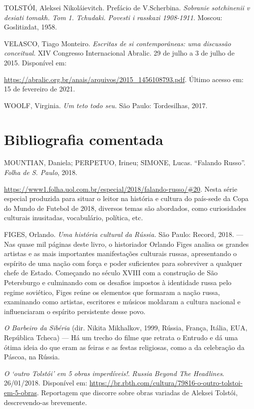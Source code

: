 \documentclass{article}
\begin{document}
TOLSTÓI, Aleksei Nikoláievitch. Prefácio de V.Scherbina. \emph{Sobranie
sotchinenii v desiati tomakh. Tom 1. Tchudaki. Povesti i rasskazi
1908-1911}. Moscou: Goslitizdat, 1958.

VELASCO, Tiago Monteiro. \emph{Escritas de si contemporâneas: uma
discussão conceitual.} XIV Congresso Internacional Abralic. 29 de julho
a 3 de julho de 2015. Disponível em:

\url{https://abralic.org.br/anais/arquivos/2015\_1456108793.pdf}.
Último acesso em: 15 de fevereiro de 2021.

WOOLF, Virginia. \emph{Um teto todo seu.} São Paulo: Tordesilhas, 2017.

\section{Bibliografia comentada}

MOUNTIAN, Daniela; PERPETUO, Irineu; SIMONE, Lucas. ``Falando Russo''.
\emph{Folha de S. Paulo}, 2018.

\url{https://www1.folha.uol.com.br/especial/2018/falando-russo/\#20}.
Nesta série especial produzida para situar o leitor na história e
cultura do país-sede da Copa do Mundo de Futebol de 2018, diversos temas
são abordados, como curiosidades culturais inusitadas, vocabulário,
política, etc.

FIGES, Orlando. \emph{Uma história cultural da Rússia.} São Paulo:
Record, 2018. --- Nas quase mil páginas deste livro, o historiador
Orlando Figes analisa os grandes artistas e as mais importantes
manifestações culturais russas, apresentando o espírito de uma nação com
força e poder suficientes para sobreviver a qualquer chefe de Estado.
Começando no século XVIII com a construção de São Petersburgo e
culminando com os desafios impostos à identidade russa pelo regime
soviético, Figes reúne os elementos que formaram a nação russa,
examinando como artistas, escritores e músicos moldaram a cultura
nacional e influenciaram o espírito persistente desse povo.

\emph{O Barbeiro da Sibéria} (dir. Nikita Mikhalkov, 1999, Rússia,
França, Itália, EUA, República Tcheca) --- Há um trecho do filme que
retrata o Entrudo e dá uma ótima ideia do que eram as feiras e as festas
religiosas, como a da celebração da Páscoa, na Rússia.

\emph{O `outro Tolstói' em 5 obras imperdíveis!}. \emph{Russia Beyond
The Headlines}. 26/01/2018. Disponível em:
\url{https://br.rbth.com/cultura/79816-o-outro-tolstoi-em-5-obras}.
Reportagem que discorre sobre obras variadas de Aleksei Tolstói,
descrevendo-as brevemente.
\end{document}
